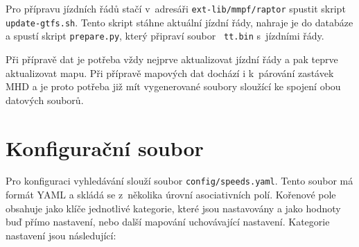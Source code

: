 Pro přípravu jízdních řádů stačí v~adresáři {\tt ext-lib/mmpf/raptor} spustit
skript {\tt update-gtfs.sh}. Tento skript stáhne aktuální jízdní řády, nahraje
je do databáze a spustí skript {\tt prepare.py}, který připraví soubor {\tt
tt.bin} s~jízdními řády. 

Při přípravě dat je potřeba vždy nejprve aktualizovat jízdní řády a pak teprve
aktualizovat mapu. Při přípravě mapových dat dochází i k~párování zastávek MHD a
je proto potřeba již mít vygenerované soubory sloužící ke spojení obou datových
souborů.

\section{Konfigurační soubor}
Pro konfiguraci vyhledávání slouží soubor {\tt config/speeds.yaml}. Tento soubor
má formát YAML a skládá se z~několika úrovní asociativních polí. Kořenové pole
obsahuje jako klíče jednotlivé kategorie, které jsou nastavovány a jako hodnoty
buď přímo nastavení, nebo další mapování uchovávající nastavení. Kategorie
nastavení jsou následující:
